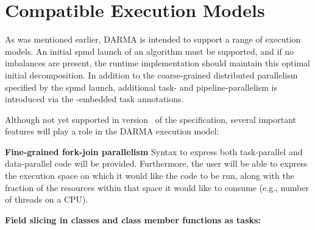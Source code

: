 
\section{Compatible Execution Models}
\label{sec:exec_model}

As was mentioned earlier, DARMA is intended to support a range of execution
models.  An initial \gls{spmd} launch of an algorithm must be supported, and if
no imbalances are present, the runtime implementation should maintain this
optimal initial decomposition. In addition to the coarse-grained distributed
parallelism specified by the \gls{spmd} launch, additional task- and
pipeline-parallelism is introduced via the \CC-embedded task annotations.

Although not yet supported in version \specVersion\ of the specification, several
important features will play a role in the DARMA execution model:
\begin{compactdesc}
\item{\bf Fine-grained \gls{fork-join} parallelism}
Syntax to express both task-parallel and data-parallel code will be provided.
Furthermore, the user will be able to express the \gls{execution space} on
which it would like the code to be run, along with the fraction of the resources within
that space it would like to consume (e.g., number of threads on a CPU).
\item{\bf Field slicing in classes and class member functions as tasks:}
\end{compactdesc}

